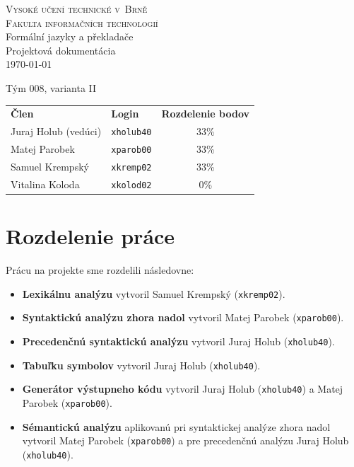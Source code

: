 \documentclass[a4paper, 11pt]{article}
\author{Juraj Holub}
\date{}
\begin{document}
\begin{titlepage}
\begin{center}
	\Huge
	\textsc{\Huge{Vysoké učení technické v~Brně} \\
	\huge{ Fakulta informačních technologií}} \\
	\LARGE{Formální jazyky a překladače} \\
	\Huge{Projektová dokumentácia} \\
	\Large{\today}
	\setlength{\parindent}{0.3em}

	{\Large Tým 008, varianta II} \\
	
\begin{table}[H]
	\Large
	\centering
	\begin{tabular}{llc}
		\textbf{Člen}        & \textbf{Login} & \textbf{Rozdelenie bodov} \\
		Juraj Holub (vedúci) & \texttt{xholub40}       & 33\%                      \\
		Matej Parobek        & \texttt{xparob00}       & 33\%                      \\
		Samuel Krempský      & \texttt{xkremp02}      & 33\%                      \\
		Vitalina Koloda      & \texttt{xkolod02}       & 0\%                      
	\end{tabular}
\end{table}
		
\end{center}
\end{titlepage}

{\hypersetup{hidelinks}\tableofcontents}
\newpage

\section{Rozdelenie práce}

Prácu na projekte sme rozdelili následovne:
\begin{itemize}
	\item{\textbf{Lexikálnu analýzu} vytvoril Samuel Krempský (\texttt{xkremp02}).}
	\item{\textbf{Syntaktickú analýzu zhora nadol} vytvoril Matej Parobek (\texttt{xparob00}).}
	\item{\textbf{Precedenčnú syntaktickú analýzu} vytvoril Juraj Holub (\texttt{xholub40}).}
	\item{\textbf{Tabuľku symbolov} vytvoril Juraj Holub (\texttt{xholub40}).}
	\item{\textbf{Generátor výstupneho kódu} vytvoril Juraj Holub (\texttt{xholub40}) a Matej Parobek (\texttt{xparob00}).}
	\item{\textbf{Sémantickú analýzu} aplikovanú pri syntaktickej analýze zhora nadol vytvoril Matej Parobek (\texttt{xparob00}) a pre precedenčnú analýzu Juraj Holub (\texttt{xholub40}).}
\end{itemize}
\end{document}
